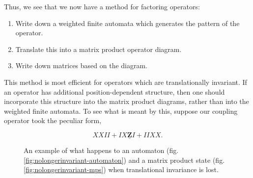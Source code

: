 \documentclass{amsbook}
\theoremstyle{plain}
\theoremstyle{definition}
\theoremstyle{remark}
\begin{document}
Thus, we see that we now have a method for factoring operators:

\begin{enumerate}
\item Write down a weighted finite automata which generates the pattern of the operator.
\item Translate this into a matrix product operator diagram.
\item Write down matrices based on the diagram.
\end{enumerate}

This method is most efficient for operators which are translationally invariant.  If an operator has additional position-dependent structure, then one should incorporate this structure into the matrix product diagrams, rather than into the weighted finite automata.  To see what is meant by this, suppose our coupling operator took the peculiar form,

$$XXII + IX\underline{\textbf{Z}}I + IIXX.$$

\begin{figure}
\caption{An example of what happens to an automaton (fig. \ref{fig:nolongerinvariant-automaton}) and a matrix product state (fig. \ref{fig:nolongerinvariant-mps}) when translational invariance is lost.}
\end{figure}
\end{document}
